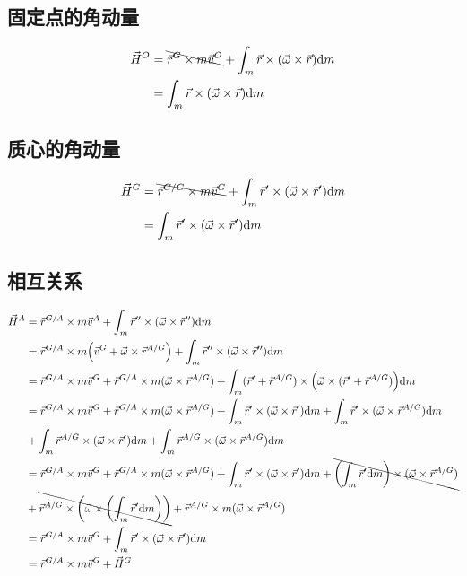 \subsection{固定点的角动量}
\begin{equation}
  \begin{split}
    \vec{H}^O&=\bcancel{\vec{r}^{G}\times m\vec{v}^O}+\int_m\vec{r}\times(\vec{\omega}\times\vec{r})\mathrm{d}m\\
    &=\int_m\vec{r}\times(\vec{\omega}\times\vec{r})\mathrm{d}m
  \end{split}
\end{equation}
\subsection{质心的角动量}
\begin{equation}
  \begin{split}
    \vec{H}^G&=\bcancel{\vec{r}^{G/G}\times m\vec{v}^G}+\int_m\vec{r}'\times(\vec{\omega}\times\vec{r}')\mathrm{d}m\\
    &=\int_m\vec{r}'\times(\vec{\omega}\times\vec{r}')\mathrm{d}m
  \end{split}
\end{equation}
\subsection{相互关系}
\begin{equation}
  \begin{split}
    \vec{H}^A&=\vec{r}^{G/A}\times m\vec{v}^A+\int_m\vec{r}''\times(\vec{\omega}\times\vec{r}'')\mathrm{d}m\\
    &=\vec{r}^{G/A}\times m\qty(\vec{v}^G+\vec{\omega}\times\vec{r}^{A/G})+\int_m\vec{r}''\times(\vec{\omega}\times\vec{r}'')\mathrm{d}m\\
    &=\vec{r}^{G/A}\times m\vec{v}^G+\vec{r}^{G/A}\times m(\vec{\omega}\times\vec{r}^{A/G})+\int_m(\vec{r}'+\vec{r}^{A/G})\times\qty(\vec{\omega}\times(\vec{r}'+\vec{r}^{A/G}))\mathrm{d}m\\
    &=\vec{r}^{G/A}\times m\vec{v}^G+\vec{r}^{G/A}\times m(\vec{\omega}\times\vec{r}^{A/G})+\int_m\vec{r}'\times(\vec{\omega}\times\vec{r}')\mathrm{d}m+\int_m\vec{r}'\times(\vec{\omega}\times\vec{r}^{A/G})\mathrm{d}m\\
    &+\int_m\vec{r}^{A/G}\times(\vec{\omega}\times\vec{r}')\mathrm{d}m+\int_m\vec{r}^{A/G}\times(\vec{\omega}\times\vec{r}^{A/G})\mathrm{d}m\\
    &=\vec{r}^{G/A}\times m\vec{v}^G+\vec{r}^{G/A}\times m(\vec{\omega}\times\vec{r}^{A/G})+\int_m\vec{r}'\times(\vec{\omega}\times\vec{r}')\mathrm{d}m+\bcancel{\qty(\int_m\vec{r}'\mathrm{d}m)\times(\vec{\omega}\times\vec{r}^{A/G})}\\
    &+\bcancel{\vec{r}^{A/G}\times\qty(\vec{\omega}\times\qty(\int_m\vec{r}'\mathrm{d}m))}+\vec{r}^{A/G}\times m(\vec{\omega}\times\vec{r}^{A/G})\\
    &=\vec{r}^{G/A}\times m\vec{v}^G+\int_m\vec{r}'\times(\vec{\omega}\times\vec{r}')\mathrm{d}m\\
    &=\vec{r}^{G/A}\times m\vec{v}^G+\vec{H}^G
  \end{split}
\end{equation}

